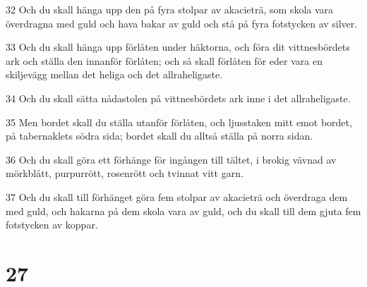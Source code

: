 \par 32 Och du skall hänga upp den på fyra stolpar av akacieträ, som skola vara överdragna med guld och hava bakar av guld och stå på fyra fotstycken av silver.
\par 33 Och du skall hänga upp förlåten under häktorna, och föra dit vittnesbördets ark och ställa den innanför förlåten; och så skall förlåten för eder vara en skiljevägg mellan det heliga och det allraheligaste.
\par 34 Och du skall sätta nådastolen på vittnesbördets ark inne i det allraheligaste.
\par 35 Men bordet skall du ställa utanför förlåten, och ljusstaken mitt emot bordet, på tabernaklets södra sida; bordet skall du alltså ställa på norra sidan.
\par 36 Och du skall göra ett förhänge för ingången till tältet, i brokig vävnad av mörkblått, purpurrött, rosenrött och tvinnat vitt garn.
\par 37 Och du skall till förhänget göra fem stolpar av akacieträ och överdraga dem med guld, och hakarna på dem skola vara av guld, och du skall till dem gjuta fem fotstycken av koppar.

\chapter{27}

